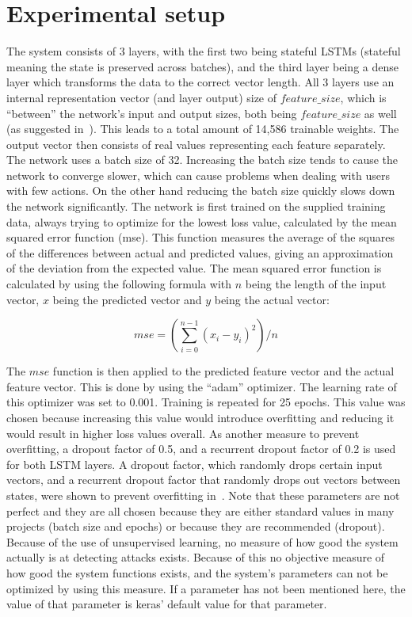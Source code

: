 \section{Experimental setup}
The system consists of 3 layers, with the first two being stateful LSTMs (stateful meaning the state is preserved across batches), and the third layer being a dense layer which transforms the data to the correct vector length. All 3 layers use an internal representation vector (and layer output) size of \(feature\_size \), which is \enquote{between} the network's input and output sizes, both being \(feature\_size \) as well (as suggested in~\cite{heaton2008introduction}). This leads to a total amount of 14,586 trainable weights. The output vector then consists of real values representing each feature separately. The network uses a batch size of 32. Increasing the batch size tends to cause the network to converge slower, which can cause problems when dealing with users with few actions. On the other hand reducing the batch size quickly slows down the network significantly. The network is first trained on the supplied training data, always trying to optimize for the lowest loss value, calculated by the mean squared error function (mse). This function measures the average of the squares of the differences between actual and predicted values, giving an approximation of the deviation from the expected value. The mean squared error function is calculated by using the following formula with \(n\) being the length of the input vector, \(x\) being the predicted vector and \(y\) being the actual vector:

\begin{equation} \label{eq:mse}
mse = (\sum\limits_{i=0}^{n - 1} {(x_i - y_i)}^2) / n
\end{equation}

The \(mse\) function is then applied to the predicted feature vector and the actual feature vector. This is done by using the \enquote{adam} optimizer. The learning rate of this optimizer was set to 0.001. Training is repeated for 25 epochs. This value was chosen because increasing this value would introduce overfitting and reducing it would result in higher loss values overall. As another measure to prevent overfitting, a dropout factor of 0.5, and a recurrent dropout factor of 0.2 is used for both LSTM layers. A dropout factor, which randomly drops certain input vectors, and a recurrent dropout factor that randomly drops out vectors between states, were shown to prevent overfitting in~\cite{srivastava2014dropout}. Note that these parameters are not perfect and they are all chosen because they are either standard values in many projects (batch size and epochs) or because they are recommended (dropout). Because of the use of unsupervised learning, no measure of how good the system actually is at detecting attacks exists. Because of this no objective measure of how good the system functions exists, and the system's parameters can not be optimized by using this measure. If a parameter has not been mentioned here, the value of that parameter is keras' default value for that parameter.

